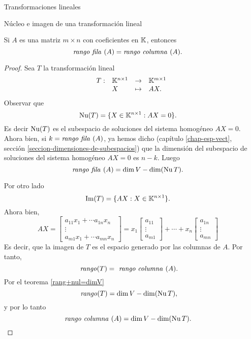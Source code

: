 \begin{chapter}{Transformaciones lineales}
\begin{section}{N\'ucleo e imagen de una transformaci\'on lineal}
        \begin{teorema}
            Si $A$ es una matriz $m \times n$ con coeficientes  en $\K$, entonces
            $$
            \text{\textit{rango fila }} (A) = \text{\textit{rango  columna }} (A).
            $$
        \end{teorema}
        \begin{proof}
            Sea $T$ la transformación lineal
            \begin{equation*}
                \begin{array}{lllll}
                &T: &\K^{n \times 1} &\to &\K^{m \times 1} \\
                &&X &\mapsto &AX.
                \end{array}
            \end{equation*}
            Observar que
            $$
            \nuc(T) = \{X \in \K^{n \times 1}: AX=0 \}.
            $$
            Es decir $\nuc(T)$  es el subespacio de soluciones del sistema homogéneo $AX=0$. Ahora bien, si $k = \text{\textit{rango fila }} (A)$, ya hemos dicho (capítulo \ref{chap-esp-vect}, sección \ref{seccion-dimensiones-de-subespacios}) que la dimensión del subespacio de soluciones del sistema homogéneo $AX=0$ es $n-k$. Luego
            \begin{equation}\label{rangofila=n-nulT}
                \text{\textit{rango fila }} (A) = \dim V - \dim (\nu T). 
            \end{equation}
            
            Por otro lado 
            $$
            \img(T) = \{AX: X \in \K^{n \times 1} \}.
            $$
            Ahora bien, 
            $$
            AX = 
            \begin{bmatrix} a_{11} x_1 +\cdots a_{1n} x_n \\ \vdots \\ a_{m1} x_1 +\cdots a_{mn} x_n  \end{bmatrix}
            = 
            x_1\begin{bmatrix} a_{11} \\ \vdots \\ a_{m1} \end{bmatrix} + \cdots +
            x_n\begin{bmatrix}  a_{1n}  \\ \vdots \\ a_{mn}  \end{bmatrix}
            $$
            Es decir, que la imagen de $T$ es el espacio generado por las columnas de $A$. Por tanto,
            $$
            \text{\textit{ rango}}(T) =\text{\textit{ rango  columna }}(A).
            $$
            Por  el  teorema \ref{rang+nul=dimV}
            $$
            \text{\textit{ rango}}(T) = \dim V -  \dim (\nu T),
            $$
            y por lo tanto
            \begin{equation}\label{rangocolumna=n-nulT}
            \text{\textit{rango columna }} (A) = \dim V -  \dim (\nu T). 
            \end{equation}
            

\end{proof}
\end{section}
\end{chapter}
